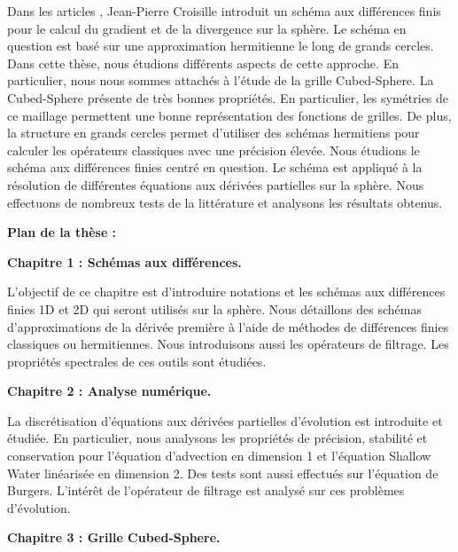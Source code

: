 Dans les articles \cite{Croisille2015,Croisille2013}, Jean-Pierre Croisille introduit un schéma aux différences finis pour le calcul du gradient et de la divergence sur la sphère. Le schéma en question est basé sur une approximation hermitienne le long de grands cercles. Dans cette thèse, nous étudions différents aspects de cette approche. En particulier, nous nous sommes attachés à l'étude de la grille Cubed-Sphere. La Cubed-Sphere présente de très bonnes propriétés. En particulier, les symétries de ce maillage permettent une bonne représentation des fonctions de grilles. De plus, la structure en grands cercles permet d'utiliser des schémas hermitiens pour calculer les opérateurs classiques avec une précision élevée. Nous étudions le schéma aux différences finies centré en question. Le schéma est appliqué à la résolution de différentes équations aux dérivées partielles sur la sphère. Nous effectuons de nombreux tests de la littérature et analysons les résultats obtenus.




\vspace{1.3cm}
\textbf{Plan de la thèse :}

\textbf{Chapitre 1 : Schémas aux différences.}

L'objectif de ce chapitre est d'introduire notations et les schémas aux différences finies 1D et 2D qui seront utilisés sur la sphère. Nous détaillons des schémas d'approximations de la dérivée première à l'aide de méthodes de différences finies classiques ou hermitiennes. Nous introduisons aussi les opérateurs de filtrage. Les propriétés spectrales de ces outils sont étudiées.







\vspace{0.7cm}
\textbf{Chapitre 2 : Analyse numérique.}

La discrétisation d'équations aux dérivées partielles d'évolution est introduite et étudiée. En particulier, nous analysons les propriétés de précision, stabilité et conservation pour l'équation d'advection en dimension 1 et l'équation Shallow Water linéarisée en dimension 2. Des tests sont aussi effectués sur l'équation de Burgers. L'intérêt de l'opérateur de filtrage est analysé sur ces problèmes d'évolution.







\vspace{0.7cm}
\textbf{Chapitre 3 : Grille Cubed-Sphere.}

